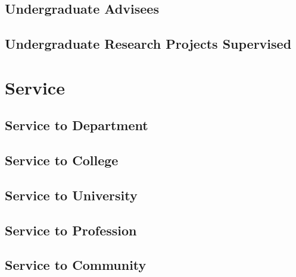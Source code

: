\documentclass[10pt]{article}
\begin{document}
	\subsection{Undergraduate Advisees}
	\begin{enumerate}
		
	\end{enumerate}
	\subsection{Undergraduate Research Projects Supervised}
	\begin{enumerate}
		
	\end{enumerate}
\fi

\clearpage
\section{Service}
\iftrue
	\subsection{Service to Department}
    	\begin{description}
    		
    	\end{description}

	\subsection{Service to College}
    	\begin{description}
    		
    	\end{description}

	\subsection{Service to University}
    	\begin{description}
    		
    	\end{description}
\fi
	\subsection{Service to Profession}
    	\begin{description}
    		
        \end{description}
	\subsection{Service to Community}
    	\begin{description}
    		
        \end{description}
\end{document}
